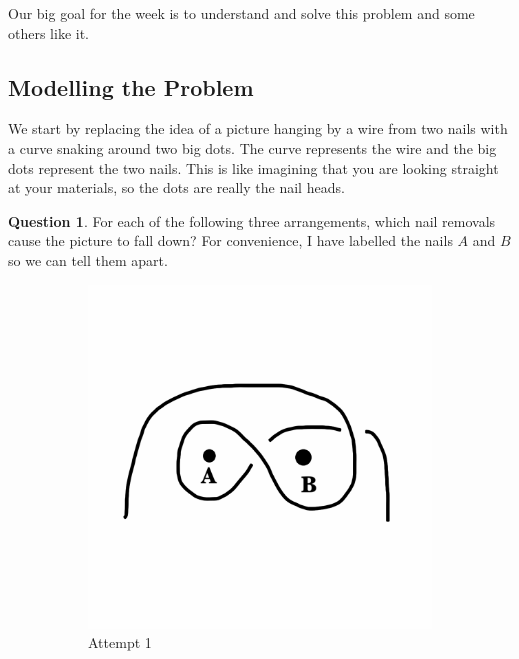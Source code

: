 \documentclass[12pt,letterpaper]{article}
\theoremstyle{definition}
\newtheorem{question}{Question}
\begin{document}
Our big goal for the week is to understand and solve this problem and some others like it.

\subsection*{Modelling the Problem}

We start by replacing the idea of a picture hanging by a wire from two nails with a curve snaking around two big dots.
The curve represents the wire and the big dots represent the two nails.
This is like imagining that you are looking straight at your materials, so the dots are really the nail heads.

\begin{question}
For each of the following three arrangements, which nail removals cause the picture to fall down?
For convenience, I have labelled the nails $A$ and $B$ so we can tell them apart.
\begin{figure}[h!]
    \centering
    \begin{subfigure}[b]{0.3\textwidth}
        \centering
        \includegraphics[width=\textwidth]{phppics/attempt1.png}
        \caption{Attempt 1}
    \end{subfigure}
    \begin{subfigure}[b]{0.3\textwidth}
        \centering

\end{subfigure}
\end{figure}
\end{question}
\end{document}
